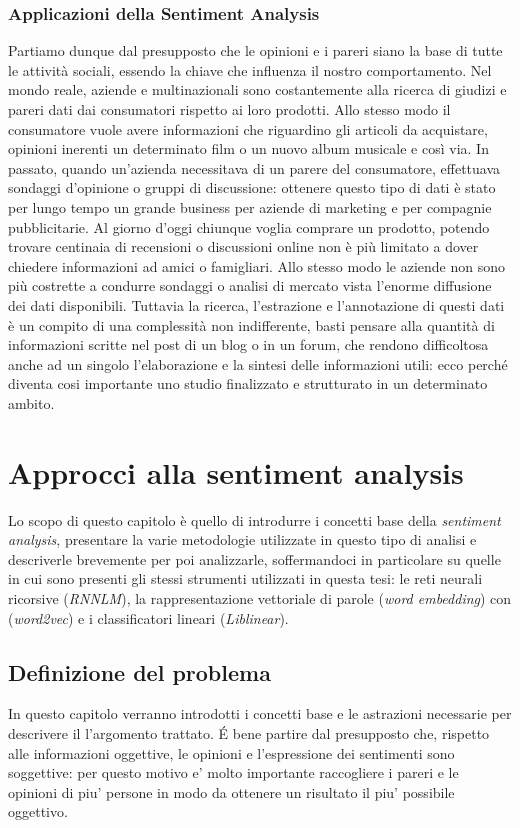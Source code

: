 \documentclass[a4paper,12pt,openright,twoside]{report}
\theoremstyle{definition}
\begin{document}
\subsection{Applicazioni della Sentiment Analysis}
Partiamo dunque dal presupposto che le opinioni e i pareri siano la base di tutte le attività sociali,
 essendo la chiave che influenza il nostro comportamento. Nel mondo reale, aziende e multinazionali 
 sono costantemente alla ricerca di giudizi e pareri dati dai consumatori  rispetto ai loro prodotti. 
 Allo stesso modo il consumatore vuole avere informazioni che riguardino gli articoli da acquistare, 
 opinioni inerenti un determinato film o un nuovo album musicale e così via. In passato, quando un’azienda 
 necessitava di un parere del consumatore, effettuava sondaggi d’opinione o gruppi di discussione: 
 ottenere questo tipo di dati è stato per lungo tempo un grande business per aziende di marketing e 
 per compagnie pubblicitarie.
Al giorno d’oggi chiunque voglia comprare un prodotto, potendo trovare centinaia di recensioni o 
discussioni online non è più limitato a dover chiedere informazioni ad amici o famigliari. 
Allo stesso modo le aziende non sono più costrette a condurre sondaggi o analisi di mercato vista 
l’enorme diffusione dei dati disponibili. Tuttavia la ricerca, l’estrazione e l’annotazione di questi 
dati è un compito di una complessità non indifferente, basti pensare alla quantità di informazioni 
scritte nel post di un blog o in un forum, che rendono difficoltosa anche ad un singolo l'elaborazione 
e la sintesi delle informazioni utili: ecco perché diventa cosi importante uno studio finalizzato e 
strutturato in un determinato ambito.

\chapter{Approcci alla sentiment analysis}

Lo scopo di questo capitolo è quello di introdurre i concetti base della \emph{sentiment analysis}, 
presentare la varie metodologie utilizzate in questo tipo di analisi e descriverle brevemente per poi 
analizzarle, soffermandoci in particolare su quelle in cui sono presenti gli stessi strumenti 
utilizzati in questa tesi: le reti neurali ricorsive (\emph{RNNLM}), 
la rappresentazione vettoriale di parole (\emph{word embedding})
con (\emph{word2vec}) e 
i classificatori lineari (\emph{Liblinear}).

\section{Definizione del problema}
In questo capitolo verranno introdotti i concetti base e le astrazioni necessarie
per descrivere il l'argomento trattato.
\'E bene partire dal presupposto che, rispetto alle informazioni oggettive, 
le opinioni e l'espressione dei sentimenti sono
soggettive: per questo motivo e' molto importante raccogliere i pareri e le opinioni di piu' persone
in modo da ottenere un risultato il piu' possibile oggettivo.
\end{document}
